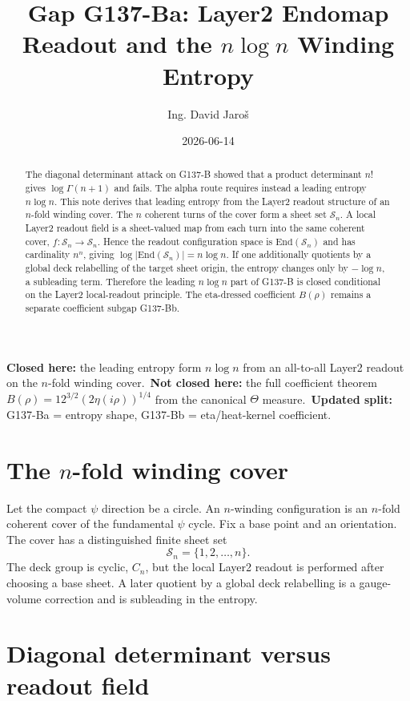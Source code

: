 \documentclass[12pt,a4paper]{article}
\title{Gap G137-Ba: Layer2 Endomap Readout and the $n\log n$ Winding Entropy}
\author{Ing. David Jaroš}
\date{2026-06-14}
\begin{document}
\maketitle

\begin{abstract}
The diagonal determinant attack on G137-B showed that a product determinant
$n!$ gives $\log\Gamma(n+1)$ and fails.  The alpha route requires instead a
leading entropy $n\log n$.  This note derives that leading entropy from the
Layer2 readout structure of an $n$-fold winding cover.  The $n$ coherent turns
of the cover form a sheet set $\mathcal S_n$.  A local Layer2 readout field is
a sheet-valued map from each turn into the same coherent cover,
$f:\mathcal S_n\to\mathcal S_n$.  Hence the readout configuration space is
$\mathrm{End}(\mathcal S_n)$ and has cardinality $n^n$, giving
$\log|\mathrm{End}(\mathcal S_n)|=n\log n$.  If one additionally quotients by a
global deck relabelling of the target sheet origin, the entropy changes only by
$-\log n$, a subleading term.  Therefore the leading $n\log n$ part of G137-B is
closed conditional on the Layer2 local-readout principle.  The eta-dressed
coefficient $B(\rho)$ remains a separate coefficient subgap G137-Bb.
\end{abstract}

\begin{statusbox}
\textbf{Closed here:} the leading entropy form $n\log n$ from an all-to-all
Layer2 readout on the $n$-fold winding cover.\
\textbf{Not closed here:} the full coefficient theorem
$B(\rho)=12^{3/2}(2\eta(i\rho))^{1/4}$ from the canonical $\Theta$ measure.\
\textbf{Updated split:} G137-Ba = entropy shape, G137-Bb = eta/heat-kernel
coefficient.
\end{statusbox}

\section{The $n$-fold winding cover}

Let the compact $\psi$ direction be a circle.  An $n$-winding configuration is
an $n$-fold coherent cover of the fundamental $\psi$ cycle.  Fix a base point
and an orientation.  The cover has a distinguished finite sheet set
\[
  \mathcal S_n=\{1,2,\ldots,n\}.
\]
The deck group is cyclic, $C_n$, but the local Layer2 readout is performed after
choosing a base sheet.  A later quotient by a global deck relabelling is a
gauge-volume correction and is subleading in the entropy.

\section{Diagonal determinant versus readout field}
\end{document}
